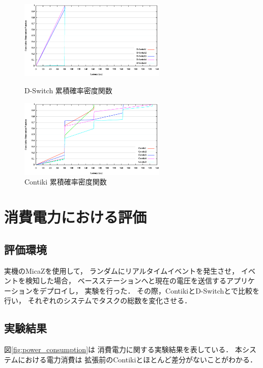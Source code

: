 \begin{figure}[htbp]
 \begin{minipage}{0.5\hsize} \begin{center}
     \includegraphics[width=70mm]{./images/cdf_d-switch.eps}
    \end{center}
    \caption{D-Switch 累積確率密度関数}
    \label{fig:cdf_d-switch}
 \end{minipage}
 \begin{minipage}{0.5\hsize}
    \begin{center}
     \includegraphics[width=70mm]{./images/cdf_contiki.eps}
    \end{center}
    \caption{Contiki 累積確率密度関数}
    \label{fig:cdf_contiki}
 \end{minipage}
\end{figure}




\section{消費電力における評価}

\subsection{評価環境}
実機のMicaZを使用して，
ランダムにリアルタイムイベントを発生させ，
イベントを検知した場合，
ベースステーションへと現在の電圧を送信するアプリケーションをデプロイし，
実験を行った．
その際，ContikiとD-Switchとで比較を行い，
それぞれのシステムでタスクの総数を変化させる．


\subsection{実験結果}\label{sec:result_consumption}
図\ref{fig:power_consumption}は
消費電力に関する実験結果を表している．
本システムにおける電力消費は
拡張前のContikiとほとんど差分がないことがわかる．


